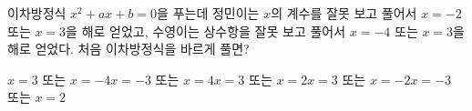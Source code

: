 이차방정식 $x^2+ax+b=0$을 푸는데 정민이는 $x$의 계수를 잘못 보고 풀어서 $x=-2$ 또는 $x=3$을 해로 얻었고, 수영이는 상수항을 잘못 보고 풀어서 $x=-4$ 또는 $x=3$을 해로 얻었다. 처음 이차방정식을 바르게 풀면? 
\begin{choicesii}{$x=3$ 또는 $x=-4$}{$x=-3$ 또는 $x=4$}{$x=3$ 또는 $x=2$}{$x=3$ 또는 $x=-2$}{$x=-3$ 또는 $x=2$}\end{choicesii}
